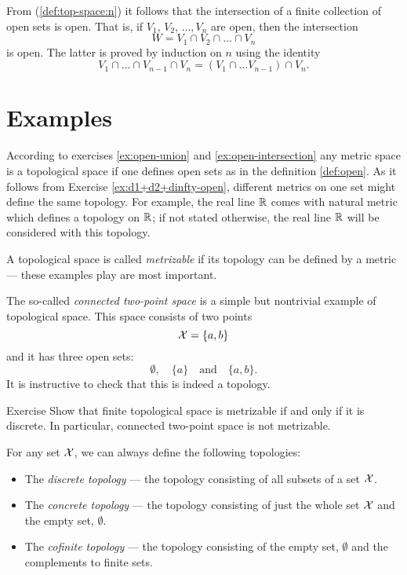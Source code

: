 From (\ref{def:top-space:n}) it follows that the intersection of a finite collection of open sets is open.
That is, if $V_1$, $V_2$, $\dots, V_n$ are open, then the intersection 
\[W=V_1 \cap V_2\cap\dots\cap V_n\] is open.
The latter is proved by induction on $n$ using the identity
\[V_1 \cap \dots\cap V_{n-1}\cap V_n=(V_1 \cap \dots V_{n-1})\cap V_n.\]

\section{Examples}\label{sec:ecamples(top)}

According to exercises \ref{ex:open-union} and \ref{ex:open-intersection} any metric space is a topological space if one defines open sets as in the definition \ref{def:open}.
As it follows from Exercise \ref{ex:d1+d2+dinfty-open},
different metrics on one set might define the same topology.
For example, the real line $\mathbb{R}$ comes with natural metric which defines a topology on $\mathbb{R}$;
if not stated otherwise, the real line $\mathbb{R}$ will be considered with this topology.

A topological space is called \emph{metrizable} if its topology can be defined by a metric --- these examples play are most important.

The so-called \emph{connected two-point space} is a simple but nontrivial example of topological space.
This space consists of two points 
\[\mathcal{X}=\{a,b\}\]
and it has three open sets: 
\[\emptyset,\quad \{a\}\quad\text{and}\quad\{a,b\}.\]
It is instructive to check that this is indeed a topology.

\begin{thm}{Exercise}\label{ex:finite+metrizable}
Show that finite topological space is metrizable if and only if it is discrete.
In particular, connected two-point space is not metrizable.
\end{thm}

For any set $\mathcal{X}$, we can always define the following topologies:
\begin{itemize} 
\item  The \emph{discrete topology} --- the topology consisting of all subsets of a set $\mathcal{X}$.
\item  The \emph{concrete topology}  --- the topology consisting of just the whole set $\mathcal{X}$ and the empty set, $\emptyset$.
\item  The \emph{cofinite topology} --- the topology consisting of the empty set, $\emptyset$ and the complements to finite sets.
\end{itemize}

